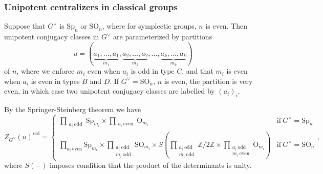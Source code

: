 \documentclass[10pt]{article}
\newcommand{\stab}[2]{\mathrm{Stab}_{#1}(#2)}
\newcommand{\Z}{\mathbb{Z}}
\newcommand{\SO}{\mathrm{SO}}
\newcommand{\Sp}{\mathrm{Sp}}
\newcommand{\OO}{\mathrm{O}}
\newcommand{\triv}{\mathrm{triv}}
\newcommand{\sgn}{\mathrm{sgn}}
\theoremstyle{definition}
\theoremstyle{remark}
\newcommand{\Gd}{G^\vee}
\newcommand{\Zur}{Z_{G^\vee}(u)^{\mathrm{red}}}
\newcommand{\Zz}{\mathcal{G}}
\begin{document}
%
\subsubsection{Unipotent centralizers in classical groups}
\label{subsubsection unipotent centralizers types BCD}
Suppose that $\Gd$ is $\Sp_{n}$ or $\SO_{n}$, where for symplectic groups, $n$ is even.
Then unipotent conjugacy classes in $G^\vee$ are parameterized by partitions 
%
\[
u=(\underbrace{a_1,\dots, a_1}_{m_1}, \underbrace{a_2,\dots, a_2}_{m_2},\dots,\underbrace{a_k,\dots, a_k}_{m_k})
\]
%
of $n$,
where we enforce $m_i$ even when $a_i$ is odd in type $C$, and that $m_i$ is even when $a_i$ is even in 
types $B$ and $D$. If $G^\vee=\SO_n$, $n$ is even, the partition is very even, in 
which case two unipotent conjugacy classes are labelled by $(a_i)_i$. 

By the Springer-Steinberg theorem \cite[Thm. 6.1.3]{CM} we have
%
\begin{equation}
\label{eqn classical centralizers form}
\Zur=
\begin{cases}
\prod_{\substack{a_i~\text{odd}}}\Sp_{m_i}\times\prod_{\substack{a_i~\text{even}}}\OO_{m_i}&\text{if}~G^\vee=\Sp_n\\
\prod_{a_i~\text{even}}\Sp_{m_i}\times \prod_{\substack{a_i~\text{odd} \\ m_i~\text{odd}}}\SO_{m_i}
\times S\left(\prod_{\substack{a_i~\text{odd} \\ m_i~\text{odd}}}\Z/2\Z\times\prod_{\substack{a_i~\text{odd}\\ m_i~\text{even}}}\OO_{m_i}\right)&\text{if}~G^\vee=\SO_n
\end{cases},
\end{equation}
%
where $S(-)$ imposes condition that the product of the determinants is unity.
\end{document}
